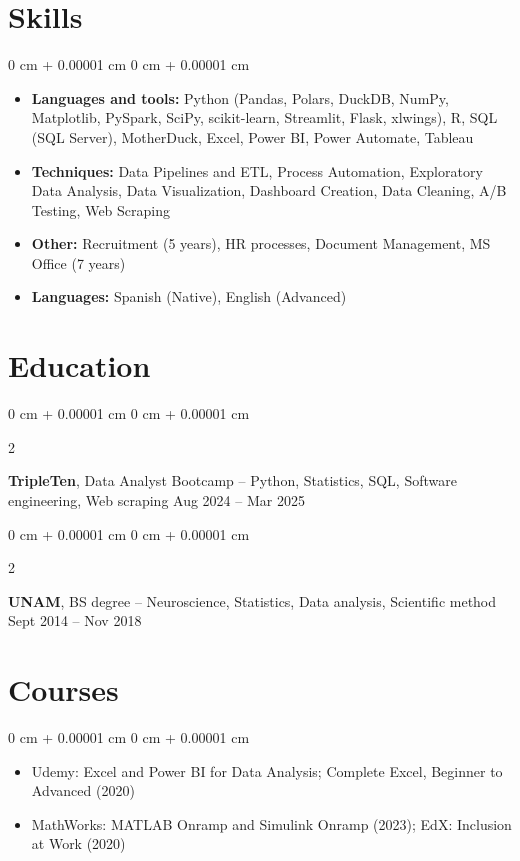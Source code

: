 \documentclass[10pt, a4paper]{article}
\newenvironment{highlightsforbulletentries}{
    \begin{itemize}[
        topsep=0.10 cm,
        parsep=0.10 cm,
        partopsep=0pt,
        itemsep=0pt,
        leftmargin=10pt
    ]
}{
    \end{itemize}
} %
\newenvironment{onecolentry}{
    \begin{adjustwidth}{
        0 cm + 0.00001 cm
    }{
        0 cm + 0.00001 cm
    }
}{
    \end{adjustwidth}
} %
\newenvironment{twocolentry}[2][]{
    \onecolentry
    \def\secondColumn{#2}
    \setcolumnwidth{\fill, 4.5 cm}
    \begin{paracol}{2}
}{
    \switchcolumn \raggedleft \secondColumn
    \end{paracol}
    \endonecolentry
} %
\begin{document}
    \section{Skills}
        \begin{onecolentry}
            \begin{highlightsforbulletentries}
                \item \textbf{Languages and tools:} Python (Pandas, Polars, DuckDB, NumPy, Matplotlib, PySpark, SciPy, scikit-learn, Streamlit, Flask, xlwings), R, SQL (SQL Server), MotherDuck, Excel, Power BI, Power Automate, Tableau
                \item \textbf{Techniques:} Data Pipelines and ETL, Process Automation, Exploratory Data Analysis, Data Visualization, Dashboard Creation, Data Cleaning, A/B Testing, Web Scraping
                \item \textbf{Other:} Recruitment (5 years), HR processes, Document Management, MS Office (7 years)
                \item \textbf{Languages:} Spanish (Native), English (Advanced)
            \end{highlightsforbulletentries}
        \end{onecolentry}

    \section{Education}
        \begin{samepage}
        \begin{twocolentry}{Aug 2024 -- Mar 2025}
            \textbf{TripleTen}, Data Analyst Bootcamp -- Python, Statistics, SQL, Software engineering, Web scraping\end{twocolentry}
        \vspace{0.10 cm}
        \begin{twocolentry}{Sept 2014 -- Nov 2018}
            \textbf{UNAM}, BS degree -- Neuroscience, Statistics, Data analysis, Scientific method\end{twocolentry}
        \end{samepage}

    \section{Courses}
        \begin{onecolentry}
            \begin{highlightsforbulletentries}
                \item Udemy: Excel and Power BI for Data Analysis; Complete Excel, Beginner to Advanced (2020)
                \item MathWorks: MATLAB Onramp and Simulink Onramp (2023); EdX: Inclusion at Work (2020)
            \end{highlightsforbulletentries}
        \end{onecolentry}
\end{document}
